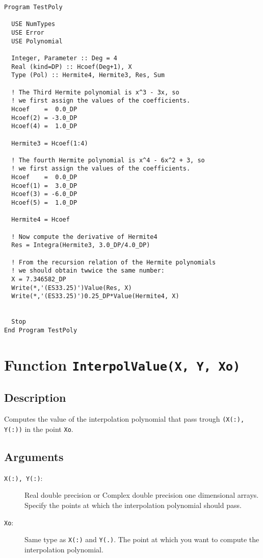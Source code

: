 \begin{lstlisting}[emph=Integra,
                   emphstyle=\color{blue},
                   frame=trBL,
                   caption=Computing the integral of a polynomial.,
                   label=integrapol]
Program TestPoly

  USE NumTypes
  USE Error
  USE Polynomial

  Integer, Parameter :: Deg = 4
  Real (kind=DP) :: Hcoef(Deg+1), X
  Type (Pol) :: Hermite4, Hermite3, Res, Sum

  ! The Third Hermite polynomial is x^3 - 3x, so
  ! we first assign the values of the coefficients.
  Hcoef    =  0.0_DP
  Hcoef(2) = -3.0_DP
  Hcoef(4) =  1.0_DP

  Hermite3 = Hcoef(1:4)

  ! The fourth Hermite polynomial is x^4 - 6x^2 + 3, so
  ! we first assign the values of the coefficients.
  Hcoef    =  0.0_DP
  Hcoef(1) =  3.0_DP
  Hcoef(3) = -6.0_DP
  Hcoef(5) =  1.0_DP

  Hermite4 = Hcoef

  ! Now compute the derivative of Hermite4
  Res = Integra(Hermite3, 3.0_DP/4.0_DP)

  ! From the recursion relation of the Hermite polynomials 
  ! we should obtain twwice the same number:
  X = 7.346582_DP
  Write(*,'(ES33.25)')Value(Res, X)
  Write(*,'(ES33.25)')0.25_DP*Value(Hermite4, X)
  

  Stop
End Program TestPoly
\end{lstlisting}

\section{Function \texttt{InterpolValue(X, Y, Xo)}}

\subsection{Description}

Computes the value of the interpolation polynomial that pass trough
\texttt{(X(:), Y(:))} in the point \texttt{Xo}.

\subsection{Arguments}

\begin{description}
\item[\texttt{X(:), Y(:)}:] Real double precision or Complex double
  precision one dimensional arrays. Specify the points at which the
  interpolation polynomial should pass. 
\item[\texttt{Xo}:] Same type as \texttt{X(:)} and \texttt{Y(.)}. The
  point at which you want to compute the interpolation polynomial.
\end{description}

